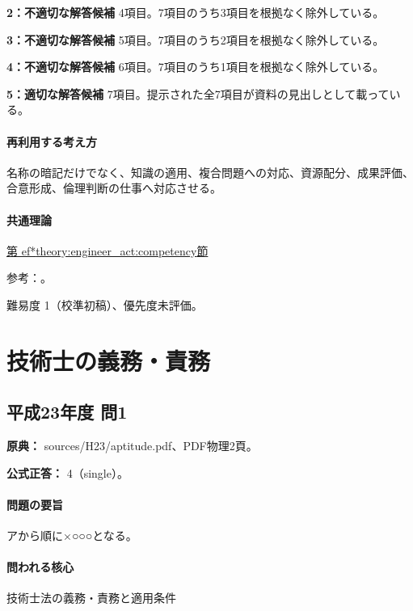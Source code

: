 \noindent\textbf{2：不適切な解答候補} 4項目。7項目のうち3項目を根拠なく除外している。\par

\noindent\textbf{3：不適切な解答候補} 5項目。7項目のうち2項目を根拠なく除外している。\par

\noindent\textbf{4：不適切な解答候補} 6項目。7項目のうち1項目を根拠なく除外している。\par

\noindent\textbf{5：適切な解答候補} 7項目。提示された全7項目が資料の見出しとして載っている。\par

\paragraph{再利用する考え方} 名称の暗記だけでなく、知識の適用、複合問題への対応、資源配分、成果評価、合意形成、倫理判断の仕事へ対応させる。

\paragraph{共通理論} \hyperref[theory:engineer_act:competency]{第
ef*{theory:engineer_act:competency}節}

\par 参考：\cite{mext_competency2014}。

\par 難易度 1（校準初稿）、優先度未評価。

\section{技術士の義務・責務}

\subsection{平成23年度 問1}
\label{q:h23-reg-apt-01}

\noindent\textbf{原典：} sources/H23/aptitude.pdf、PDF物理2頁。

\textbf{公式正答：} 4（single）。

\paragraph{問題の要旨} アから順に×○○○となる。

\paragraph{問われる核心} 技術士法の義務・責務と適用条件

